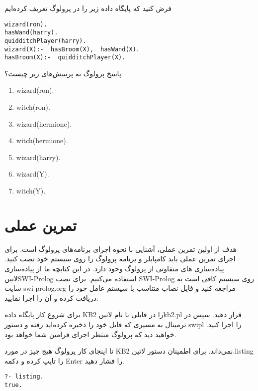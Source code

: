 \begin{exercise}
فرض کنید که پایگاه داده زیر را در پرولوگ تعریف کرده‌ایم
\begin{latin}
\begin{lstlisting}
wizard(ron). 
hasWand(harry). 
quidditchPlayer(harry). 
wizard(X):-  hasBroom(X),  hasWand(X). 
hasBroom(X):-  quidditchPlayer(X).
\end{lstlisting}
\end{latin}
\noindent پاسخ پرولوگ به پرسش‌های زیر چیست؟
\begin{latin}
\begin{enumerate}
\item wizard(ron).
\item witch(ron).
\item wizard(hermione).
\item witch(hermione).
\item wizard(harry).
\item wizard(Y).
\item witch(Y).
\end{enumerate}
\end{latin}
\end{exercise}

\clearpage

\section{تمرین عملی}
هدف از اولین تمرین عملی، آشنایی با نحوه اجرای برنامه‌های پرولوگ است. برای اجرای تمرین عملی باید کامپایلر و برنامه پرولوگ را روی سیستم خود نصب کنید. پیاده‌سازی های متفاوتی از پرولوگ وجود دارد. در این کتابچه ما از پیاده‌سازی ‌لاتین{SWI-Prolog} استفاده می‌کنیم. برای نصب SWI-Prolog روی سیستم کافی است به سایت swi-prolog.org مراجعه کنید و فایل نصاب متناسب با سیستم عامل خود را دریافت کرده و آن را اجرا نمایید.

برای شروع کار پایگاه داده KB2 را در فایلی با نام ‌لاتین{kb2.pl} قرار دهید. سپس در ترمینال به مسیری که فایل خود را ذخیره کرده‌اید رفته و دستور swipl را اجرا کنید. خواهید دید که پرولوگ منتظر اجرای فرامین شما خواهد بود.

تا اینجای کار پرولوگ هیچ چیز در مورد KB2 نمی‌داند. برای اطمینان دستور ‌لاتین{.listing} را تایپ کرده و دکمه Enter را فشار دهید.

\begin{latin}
\begin{lstlisting}
?- listing.
true.
\end{lstlisting}
\end{latin}

